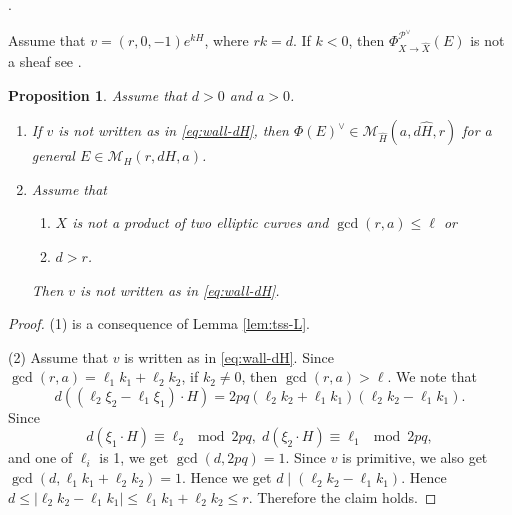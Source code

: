 \documentclass[10pt]{amsart}
\def\cal{\mathcal}
\newenvironment{NB}{
\color{red}{\bf NB}. \footnotesize 
}{}
\numberwithin{equation}{section}
\theoremstyle{plain}
\newtheorem{prop}[thm]{Proposition}
\theoremstyle{definition}
\theoremstyle{remark}
\begin{document}
\begin{NB}
Assume that $v=(r,0,-1)e^{kH}$, where $rk=d$.
If $k<0$, then $\Phi_{X \to \widehat{X}}^{{\cal P}^{\vee}}(E)$
is not a sheaf 
see \cite[Prop. 3.5]{CNY2}.
\end{NB}


\begin{prop}
Assume that $d>0$ and $a>0$.
\begin{enumerate}
\item[(1)]
If $v$ is not written as in \eqref{eq:wall-dH}, then
$\Phi(E)^{\vee} \in {\cal M}_{\widehat{H}}(a,d \widehat{H},r)$
 for a general $E \in {\cal M}_H(r,dH,a)$.
\item[(2)]
Assume that 
\begin{enumerate}
\item
$X$ is not a product of two elliptic curves and $\gcd(r,a) \leq \ell$ or 
\item $d > r$.
\end{enumerate}
Then
$v$ is not written as in \eqref{eq:wall-dH}.
\end{enumerate}
\end{prop}

\begin{proof}
(1) is a consequence of Lemma \ref{lem:tss-L}.

(2)
Assume that $v$ is written as in \eqref{eq:wall-dH}.
Since $\gcd(r,a)=\ell_1 k_1+\ell_2 k_2$, if $k_2 \ne 0$, then $\gcd(r,a) > \ell$.
We note that
$$
d((\ell_2 \xi_2-\ell_1 \xi_1)\cdot H)=2pq (\ell_2 k_2+\ell_1 k_1)(\ell_2 k_2-\ell_1 k_1).
$$
Since 
$$
d(\xi_1 \cdot H) \equiv \ell_2 \mod 2pq,\;
d(\xi_2 \cdot H) \equiv \ell_1 \mod 2pq,
$$
and one of $\ell_i$ is 1,
we get $\gcd(d,2pq)=1$.
Since $v$ is primitive, we also get 
$\gcd(d,\ell_1 k_1+\ell_2 k_2)=1$.
Hence 
we get $d \mid (\ell_2 k_2-\ell_1 k_1)$.
Hence $d \leq |\ell_2 k_2-\ell_1 k_1| \leq \ell_1 k_1+\ell_2 k_2 \leq r$.
Therefore the claim holds.
\end{proof}
\end{document}
